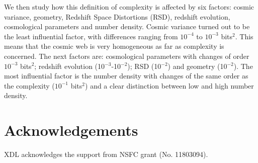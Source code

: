 \documentclass[fleqn,usenatbib]{mnras}
\begin{document}
We then study how this definition of complexity is affected by six
factors: cosmic variance, geometry, Redshift Space Distortions (RSD),
redshift evolution, cosmological parameters and number density. Cosmic
variance turned out to be the least influential factor, with
differences ranging from $10^{-4}$ to $10^{-3}$ bits$^2$. This means
that the cosmic web is very homogeneous as far as complexity is
concerned. The next factors are: cosmological parameters with changes
of order $10^{-3}$ bits$^2$; redshift evolution (10$^{-3}$-10$^{-2}$);
RSD (10$^{-2}$) and geometry (10$^{-2}$). The most influential factor
is the number density with changes of the same order as the complexity
($10^{-1}$ bits$^2$) and a clear distinction between low and high
number density.  

\section*{Acknowledgements}
XDL acknowledges the support from NSFC grant (No. 11803094).



\end{document}
